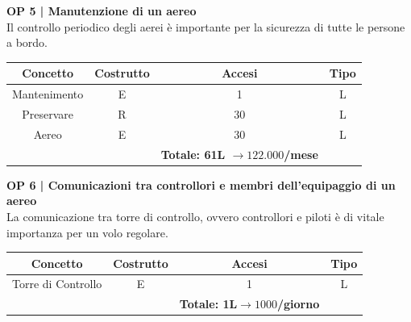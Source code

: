 \vspace{.6cm}


\textbf{\small OP 5 | Manutenzione di un aereo}\\

\textsf{\small Il controllo periodico degli aerei è importante per la sicurezza di tutte le persone a bordo.}\break

\begin{tabular}{ c c c c} 
	\hline
	\rowcolor{airforceblue}
	\textbf{\color{white}Concetto} & \textbf{\color{white}Costrutto} & \textbf{\color{white}Accesi} & \textbf{\color{white}Tipo}\\
	\hline
	\textsf{\small Mantenimento} & \textsf{\small E} & \textsf{\small 1} &  \textsf{\small L}\\
	\hline
	\textsf{\small Preservare} & \textsf{\small R} & \textsf{\small 30} &  \textsf{\small L}\\
	\hline
	\textsf{\small Aereo} & \textsf{\small E} & \textsf{\small 30} &  \textsf{\small L}\\
	\hline
	\rowcolor{airforceblue}
	\textsf{\small } & \textsf{\small } & \textbf{\color{white}Totale: 61L $\rightarrow 122.000$/mese} \textsf{\small } & \textsf{\small }\\ %
	\hline
\end{tabular}

\vspace{.6cm}


\pagebreak

\textbf{\small OP 6 | Comunicazioni tra controllori e membri dell'equipaggio di un aereo}\\

\textsf{\small La comunicazione tra torre di controllo, ovvero controllori e piloti è di vitale importanza per un volo regolare.}\break

\begin{tabular}{ c c c c}
	\hline
	\rowcolor{airforceblue}
	\textbf{\color{white}Concetto} & \textbf{\color{white}Costrutto} & \textbf{\color{white}Accesi} & \textbf{\color{white}Tipo}\\
	\hline
	\textsf{\small Torre di Controllo} & \textsf{\small E} & \textsf{\small 1} &  \textsf{\small L}\\
	\hline
	\rowcolor{airforceblue}
	\textsf{\small } & \textsf{\small } & \textbf{\color{white}Totale: 1L$\rightarrow 1000$/giorno } \textsf{\small } & \textsf{\small }\\ 
	\hline
\end{tabular}

